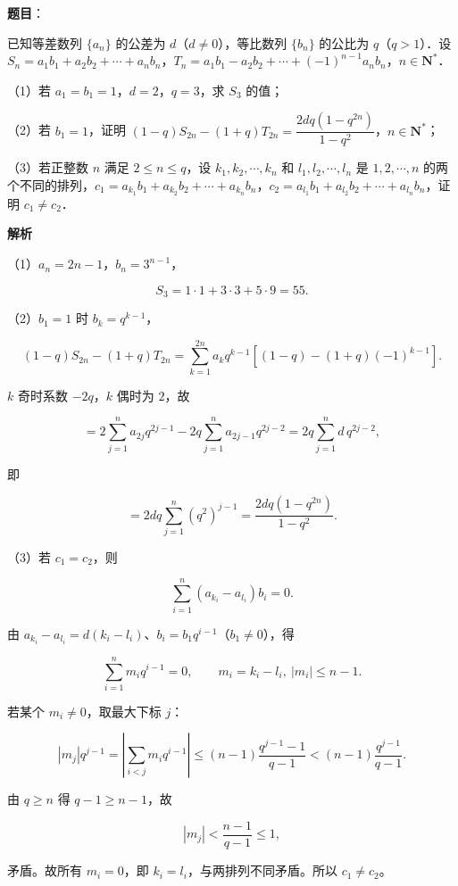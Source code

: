 \begin{answer}

\textbf{题目}：

已知等差数列 $\{a_n\}$ 的公差为 $d$（$d\neq0$），等比数列 $\{b_n\}$ 的公比为 $q$（$q>1$）．设 $S_n=a_1b_1+a_2b_2+\cdots+a_nb_n$，$T_n=a_1b_1-a_2b_2+\cdots+(-1)^{n-1}a_nb_n$，$n\in\mathbf N^*$．

（1）若 $a_1=b_1=1$，$d=2$，$q=3$，求 $S_3$ 的值；

（2）若 $b_1=1$，证明 $(1-q)S_{2n}-(1+q)T_{2n}=\dfrac{2dq(1-q^{2n})}{1-q^2}$，$n\in\mathbf N^*$；

（3）若正整数 $n$ 满足 $2\leqslant n\leqslant q$，设 $k_1,k_2,\cdots,k_n$ 和 $l_1,l_2,\cdots,l_n$ 是 $1,2,\cdots,n$ 的两个不同的排列，$c_1=a_{k_1}b_1+a_{k_2}b_2+\cdots+a_{k_n}b_n$，$c_2=a_{l_1}b_1+a_{l_2}b_2+\cdots+a_{l_n}b_n$，证明 $c_1\neq c_2$．

\textbf{解析}

（1）$a_n=2n-1$，$b_n=3^{n-1}$，

\nopagebreak[4]
\[S_3=1\cdot1+3\cdot3+5\cdot9=55 .\]

（2）$b_1=1$ 时 $b_k=q^{k-1}$，

\nopagebreak[4]
\[(1-q)S_{2n}-(1+q)T_{2n}
=\sum_{k=1}^{2n}a_kq^{k-1}\left[(1-q)-(1+q)(-1)^{k-1}\right].\]

$k$ 奇时系数 $-2q$，$k$ 偶时为 $2$，故

\nopagebreak[4]
\[=2\sum_{j=1}^n a_{2j}q^{2j-1}-2q\sum_{j=1}^n a_{2j-1}q^{2j-2}
=2q\sum_{j=1}^n d\,q^{2j-2},\]

即

\nopagebreak[4]
\[=2dq\sum_{j=1}^{n}(q^2)^{j-1}
=\frac{2dq(1-q^{2n})}{1-q^2} .\]

（3）若 $c_1=c_2$，则

\nopagebreak[4]
\[\sum_{i=1}^{n}\left(a_{k_i}-a_{l_i}\right)b_i=0 .\]

由 $a_{k_i}-a_{l_i}=d(k_i-l_i)$、$b_i=b_1q^{i-1}$（$b_1\neq0$），得

\nopagebreak[4]
\[\sum_{i=1}^{n}m_iq^{i-1}=0,\qquad m_i=k_i-l_i,\ |m_i|\leqslant n-1 .\]

若某个 $m_i\neq0$，取最大下标 $j$：

\nopagebreak[4]
\[|m_j|q^{j-1}
=\left|\sum_{i<j}m_iq^{i-1}\right|
\leqslant(n-1)\frac{q^{j-1}-1}{q-1}
<(n-1)\frac{q^{j-1}}{q-1} .\]

由 $q\geqslant n$ 得 $q-1\geqslant n-1$，故

\nopagebreak[4]
\[|m_j|<\frac{n-1}{q-1}\leqslant1,\]

矛盾。故所有 $m_i=0$，即 $k_i=l_i$，与两排列不同矛盾。所以 $c_1\neq c_2$。


\end{answer}